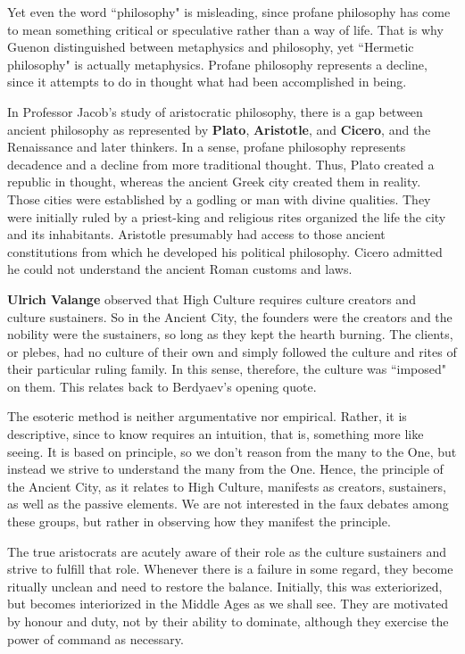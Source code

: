 Yet even the word ``philosophy" is misleading, since profane philosophy has come to mean something critical or speculative rather than a way of life. That is why Guenon distinguished between metaphysics and philosophy, yet ``Hermetic philosophy" is actually metaphysics. Profane philosophy represents a decline, since it attempts to do in thought what had been accomplished in being.

In Professor Jacob's study of aristocratic philosophy, there is a gap between ancient philosophy as represented by \textbf{Plato}, \textbf{Aristotle}, and \textbf{Cicero}, and the Renaissance and later thinkers. In a sense, profane philosophy represents decadence and a decline from more traditional thought. Thus, Plato created a republic in thought, whereas the ancient Greek city created them in reality. Those cities were established by a godling or man with divine qualities. They were initially ruled by a priest-king and religious rites organized the life the city and its inhabitants. Aristotle presumably had access to those ancient constitutions from which he developed his political philosophy. Cicero admitted he could not understand the ancient Roman customs and laws.

\textbf{Ulrich Valange} observed that High Culture requires culture creators and culture sustainers. So in the Ancient City, the founders were the creators and the nobility were the sustainers, so long as they kept the hearth burning. The clients, or plebes, had no culture of their own and simply followed the culture and rites of their particular ruling family. In this sense, therefore, the culture was ``imposed" on them. This relates back to Berdyaev's opening quote.

The esoteric method is neither argumentative nor empirical. Rather, it is descriptive, since to know requires an intuition, that is, something more like seeing. It is based on principle, so we don't reason from the many to the One, but instead we strive to understand the many from the One. Hence, the principle of the Ancient City, as it relates to High Culture, manifests as creators, sustainers, as well as the passive elements. We are not interested in the faux debates among these groups, but rather in observing how they manifest the principle.

The true aristocrats are acutely aware of their role as the culture sustainers and strive to fulfill that role. Whenever there is a failure in some regard, they become ritually unclean and need to restore the balance. Initially, this was exteriorized, but becomes interiorized in the Middle Ages as we shall see. They are motivated by honour and duty, not by their ability to dominate, although they exercise the power of command as necessary.

